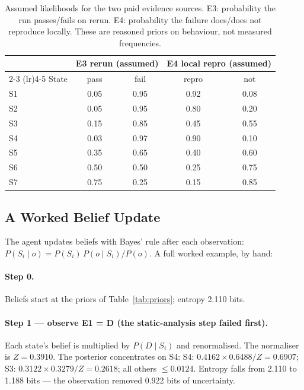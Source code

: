 \documentclass{article}
\begin{document}
\begin{table}[t]
\centering
\small
\begin{tabular}{lcccc}
\toprule
 & \multicolumn{2}{c}{E3 rerun (assumed)} & \multicolumn{2}{c}{E4 local repro (assumed)} \\
\cmidrule(lr){2-3} \cmidrule(lr){4-5}
State & pass & fail & repro & not \\
\midrule
S1 & 0.05 & 0.95 & 0.92 & 0.08 \\
S2 & 0.05 & 0.95 & 0.80 & 0.20 \\
S3 & 0.15 & 0.85 & 0.45 & 0.55 \\
S4 & 0.03 & 0.97 & 0.90 & 0.10 \\
S5 & 0.35 & 0.65 & 0.40 & 0.60 \\
S6 & 0.50 & 0.50 & 0.25 & 0.75 \\
S7 & 0.75 & 0.25 & 0.15 & 0.85 \\
\bottomrule
\end{tabular}
\caption{Assumed likelihoods for the two paid evidence sources. E3: probability the run passes/fails on rerun. E4: probability the failure does/does not reproduce locally. These are reasoned priors on behaviour, not measured frequencies.}
\label{tab:e34}
\end{table}

\subsection{A Worked Belief Update}

The agent updates beliefs with Bayes' rule after each observation: $P(S_i \mid o) = P(S_i)\,P(o \mid S_i) / P(o)$. A full worked example, by hand:

\paragraph{Step 0.} Beliefs start at the priors of Table~\ref{tab:priors}; entropy 2.110 bits.

\paragraph{Step 1 --- observe E1 = D (the static-analysis step failed first).}
Each state's belief is multiplied by $P(D \mid S_i)$ and renormalised. The normaliser is $Z = 0.3910$. The posterior concentrates on S4:
S4: $0.4162 \times 0.6488 / Z = 0.6907$;
S3: $0.3122 \times 0.3279 / Z = 0.2618$;
all others $\le 0.0124$. Entropy falls from 2.110 to 1.188 bits --- the observation removed 0.922 bits of uncertainty.
\end{document}

